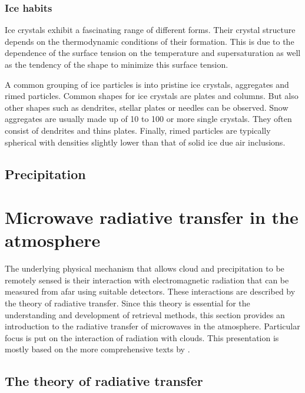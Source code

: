 \subsection{Ice habits}

Ice crystals exhibit a fascinating range of different forms. Their crystal
structure depends on the thermodynamic conditions of their formation. This is
due to the dependence of the surface tension on the temperature and
supersaturation as well as the tendency of the shape to minimize this surface
tension.

A common grouping of ice particles is into pristine ice crystals, aggregates and
rimed particles. Common shapes for ice crystals are plates and columns. But also
other shapes such as dendrites, stellar plates or needles can be observed. Snow
aggregates are usually made up of 10 to 100 or more single crystals. They often
consist of dendrites and thins plates. Finally, rimed particles are typically
spherical with densities slightly lower than that of solid ice due air
inclusions.

\section{Precipitation}




\chapter{Microwave radiative transfer in the atmosphere}
\label{ch:radiative_transfer}

The underlying physical mechanism that allows cloud and precipitation to be
remotely sensed is their interaction with electromagnetic radiation that can be
measured from afar using suitable detectors. These interactions are described by
the theory of radiative transfer. Since this theory is essential for the
understanding and development of retrieval methods, this section provides an
introduction to the radiative transfer of microwaves in the atmosphere.
Particular focus is put on the interaction of radiation with clouds. This
presentation is mostly based on the more comprehensive texts by
\textcite{thomas02, mischenko02, wallace06}.

\section{The theory of radiative transfer}

